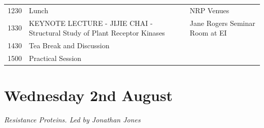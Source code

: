 \documentclass[12pt,]{book}
\theoremstyle{definition}
\theoremstyle{definition}
\theoremstyle{remark}
\begin{document}
\begin{longtable}[]{@{}lll@{}}
\begin{minipage}[t]{0.09\columnwidth}
1230\strut
\end{minipage} & \begin{minipage}[t]{0.39\columnwidth}\raggedright\strut
Lunch\strut
\end{minipage} & \begin{minipage}[t]{0.39\columnwidth}\raggedright\strut
NRP Venues\strut
\end{minipage}\tabularnewline
\begin{minipage}[t]{0.09\columnwidth}\raggedright\strut
1330\strut
\end{minipage} & \begin{minipage}[t]{0.39\columnwidth}\raggedright\strut
KEYNOTE LECTURE - JIJIE CHAI - Structural Study of Plant Receptor
Kinases\strut
\end{minipage} & \begin{minipage}[t]{0.39\columnwidth}\raggedright\strut
Jane Rogers Seminar Room at EI\strut
\end{minipage}\tabularnewline
\begin{minipage}[t]{0.09\columnwidth}\raggedright\strut
1430\strut
\end{minipage} & \begin{minipage}[t]{0.39\columnwidth}\raggedright\strut
Tea Break and Discussion\strut
\end{minipage} & \begin{minipage}[t]{0.39\columnwidth}\raggedright\strut
\strut
\end{minipage}\tabularnewline
\begin{minipage}[t]{0.09\columnwidth}\raggedright\strut
1500\strut
\end{minipage} & \begin{minipage}[t]{0.39\columnwidth}\raggedright\strut
Practical Session\strut
\end{minipage} & \begin{minipage}[t]{0.39\columnwidth}\raggedright\strut
\strut
\end{minipage}\tabularnewline
\bottomrule
\end{longtable}

\section*{Wednesday 2nd August}\label{wednesday-2nd-august}

\emph{Resistance Proteins. Led by Jonathan Jones}
\end{document}
